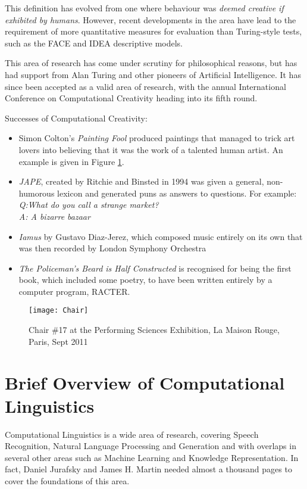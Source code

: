 This definition has evolved from one where behaviour was \textit{deemed creative if exhibited by humans}\cite{wiggins2006searching}. However, recent developments in the area have lead to the requirement of more quantitative measures for evaluation than Turing-style tests, such as the FACE and IDEA descriptive models\cite{colton2011computational}.

This area of research has come under scrutiny for philosophical reasons, but has had support from Alan Turing and other pioneers of Artificial Intelligence. It has since been accepted as a valid area of research, with the annual International Conference on Computational Creativity heading into its fifth round.

Successes of Computational Creativity:
\begin{itemize}
\item{Simon Colton's \textit{Painting Fool}\cite{colton2012painting} produced paintings that managed to trick art lovers into believing that it was the work of a talented human artist. An example is given in Figure \ref{fig:chair}.}
\item{\textit{JAPE}\cite{binsted1997computational}, created by Ritchie and Binsted in 1994 was given a general, non-humorous lexicon and generated puns as answers to questions. For example:\\\textit{Q:What do you call a strange market?\\ A: A bizarre bazaar}}
\item{\textit{Iamus} by Gustavo Diaz-Jerez\cite{diaz2011composing}, which composed music entirely on its own that was then recorded by London Symphony Orchestra}
\item{\textit{The Policeman's Beard is Half Constructed}\cite{chamberlain1984policeman} is recognised for being the first book, which included some poetry, to have been written entirely by a computer program, RACTER.}
\end{itemize} 

\begin{figure}[h!]
\centering
\texttt{[image: Chair]}
\caption{Chair \#17 at the Performing Sciences Exhibition, La Maison Rouge, Paris, Sept 2011}
\label{fig:chair}
\end{figure}

\section{Brief Overview of Computational Linguistics}
Computational Linguistics is a wide area of research, covering Speech Recognition, Natural Language Processing and Generation and with overlaps in several other areas such as Machine Learning and Knowledge Representation. In fact, Daniel Jurafsky and James H. Martin needed almost a thousand pages to cover the foundations of this area\cite{jurafsky2000speech}.

